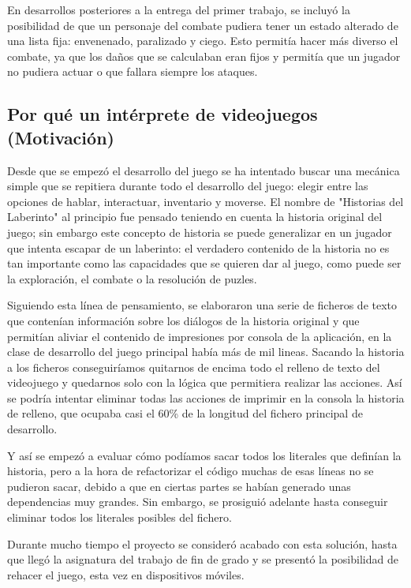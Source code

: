 \documentclass[12pt]{article}
\begin{document}
\begin{itemize}
En desarrollos posteriores a la entrega del primer trabajo, se incluyó la posibilidad de que un personaje del combate pudiera tener un estado alterado de una lista fija: envenenado, paralizado y ciego.
Esto permitía hacer más diverso el combate, ya que los daños que se calculaban eran fijos y permitía que un jugador no pudiera actuar o que fallara siempre los ataques.
\end{itemize}

\subsection{Por qué un intérprete de videojuegos (Motivación)}

Desde que se empezó el desarrollo del juego se ha intentado buscar una mecánica simple que se repitiera durante todo el desarrollo del juego: elegir entre las opciones de hablar, interactuar, inventario y moverse. 
El nombre de "Historias del Laberinto" al principio fue pensado teniendo en cuenta la historia original del juego; sin embargo este concepto de historia se puede generalizar en un jugador que intenta escapar de un laberinto: el verdadero contenido de la historia no es tan importante como las capacidades que se quieren dar al juego, como puede ser la exploración, el combate o la resolución de puzles.

Siguiendo esta línea de pensamiento, se elaboraron una serie de ficheros de texto que contenían información sobre los diálogos de la historia original y que permitían aliviar el contenido de impresiones por consola de la aplicación, en la clase de desarrollo del juego principal había más de mil lineas.
Sacando la historia a los ficheros conseguiríamos quitarnos de encima todo el relleno de texto del videojuego y quedarnos solo con la lógica que permitiera realizar las acciones. Así se podría intentar eliminar todas las acciones de imprimir en la consola la historia de relleno, que ocupaba casi el 60\% de la longitud del fichero principal de desarrollo.

Y así se empezó a evaluar cómo podíamos sacar todos los literales que definían la historia, pero a la hora de refactorizar el código muchas de esas líneas no se pudieron sacar, debido a que en ciertas partes se habían generado unas dependencias muy grandes. Sin embargo, se prosiguió adelante hasta conseguir eliminar todos los literales posibles del fichero.

Durante mucho tiempo el proyecto se consideró acabado con esta solución, hasta que llegó la asignatura del trabajo de fin de grado y se presentó la posibilidad de rehacer el juego, esta vez en dispositivos móviles.
\end{document}
